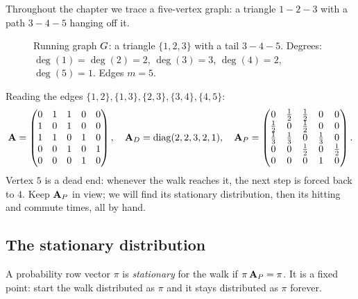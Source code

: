 \begin{example}\label{ch35:ex-running}
Throughout the chapter we trace a five-vertex graph: a triangle $1\!-\!2\!-\!3$ with a path $3\!-\!4\!-\!5$ hanging off it.

\begin{figure}[H]
\centering
{}
\caption{Running graph $G$: a triangle $\{1,2,3\}$ with a tail $3\!-\!4\!-\!5$. Degrees: $\deg(1)=\deg(2)=2$, $\deg(3)=3$, $\deg(4)=2$, $\deg(5)=1$. Edges $m=5$.}
\label{ch35:fig-running}
\end{figure}

Reading the edges $\{1,2\},\{1,3\},\{2,3\},\{3,4\},\{4,5\}$:
\[
  \mathbf{A}=\begin{pmatrix}0&1&1&0&0\\1&0&1&0&0\\1&1&0&1&0\\0&0&1&0&1\\0&0&0&1&0\end{pmatrix},
  \quad
  \mathbf{A}_D=\mathrm{diag}(2,2,3,2,1),
  \quad
  \mathbf{A}_P=\begin{pmatrix}
  0&\tfrac12&\tfrac12&0&0\\
  \tfrac12&0&\tfrac12&0&0\\
  \tfrac13&\tfrac13&0&\tfrac13&0\\
  0&0&\tfrac12&0&\tfrac12\\
  0&0&0&1&0
  \end{pmatrix}.
\]
Vertex $5$ is a dead end: whenever the walk reaches it, the next step is forced back to $4$. Keep $\mathbf{A}_P$ in view; we will find its stationary distribution, then its hitting and commute times, all by hand.
\end{example}

\subsection{The stationary distribution}

\begin{definition}\label{ch35:def-stationary}
A probability row vector $\pi$ is \emph{stationary} for the walk if $\pi\,\mathbf{A}_P=\pi$. It is a fixed point: start the walk distributed as $\pi$ and it stays distributed as $\pi$ forever.
\end{definition}

